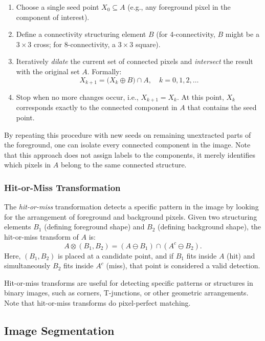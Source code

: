 \documentclass[a4paper,12pt]{article}
\begin{document}
\begin{enumerate}
    \item Choose a single seed point \( X_0 \subseteq A \) (e.g., any foreground pixel in the component of interest).
    \item Define a connectivity structuring element \(B\) (for 4-connectivity, \(B\) might be a \(3\times 3\) cross; for 8-connectivity, a \(3\times 3\) square).
    \item Iteratively \emph{dilate} the current set of connected pixels and \emph{intersect} the result with the original set \(A\). Formally:
    \[
      X_{k+1} = \bigl( X_k \oplus B \bigr) \cap A, \quad k = 0, 1, 2, \ldots
    \]
    \item Stop when no more changes occur, i.e., \( X_{k+1} = X_k \). At this point, \(X_k\) corresponds exactly to the connected component in \(A\) that contains the seed point.
\end{enumerate}

By repeating this procedure with new seeds on remaining unextracted parts of the foreground, one can isolate every connected component in the image. Note that this approach does not assign labels to the components, it merely identifies which pixels in \(A\) belong to the same connected structure.

\subsubsection{Hit-or-Miss Transformation}

The \emph{hit-or-miss} transformation detects a specific pattern in the image by looking for the arrangement of foreground and background pixels. Given two structuring elements \(B_1\) (defining foreground shape) and \(B_2\) (defining background shape), the hit-or-miss transform of \(A\) is:
\[
  A \otimes (B_1, B_2) = (A \ominus B_1) \cap (A^c \ominus B_2).
\]
Here, \((B_1, B_2)\) is placed at a candidate point, and if \(B_1\) fits inside \(A\) (hit) and simultaneously \(B_2\) fits inside \(A^c\) (miss), that point is considered a valid detection.

Hit-or-miss transforms are useful for detecting specific patterns or structures in binary images, such as corners, T-junctions, or other geometric arrangements. Note that hit-or-miss transforms do pixel-perfect matching.

\newpage

\subsection{Image Segmentation}
\end{document}
